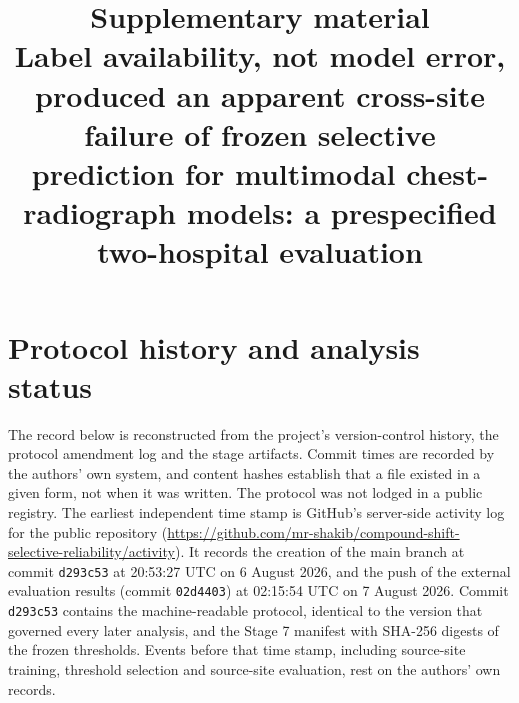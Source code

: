 \documentclass[10pt,a4paper]{article}
\title{Supplementary material\\[2pt]\large Label availability, not model
error, produced an apparent cross-site failure of frozen selective prediction
for multimodal chest-radiograph models: a prespecified two-hospital
evaluation}
\author{}
\date{}
\begin{document}
\maketitle
\tableofcontents

\section{Protocol history and analysis status}\label{ssec:protocol}
The record below is reconstructed from the project's version-control history,
the protocol amendment log and the stage artifacts. Commit times are recorded
by the authors' own system, and content hashes establish that a file existed in
a given form, not when it was written. The protocol was not lodged in a public
registry. The earliest independent time stamp is GitHub's server-side activity
log for the public repository
(\url{https://github.com/mr-shakib/compound-shift-selective-reliability/activity}).
It records the creation of the main branch at commit \texttt{d293c53} at 20:53:27
UTC on 6 August 2026, and the push of the external evaluation results (commit
\texttt{02d4403}) at 02:15:54 UTC on 7 August 2026. Commit \texttt{d293c53}
contains the machine-readable protocol, identical to the version that governed
every later analysis, and the Stage 7 manifest with SHA-256 digests of the
frozen thresholds. Events before that time stamp, including source-site
training, threshold selection and source-site evaluation, rest on the authors'
own records.
\end{document}
